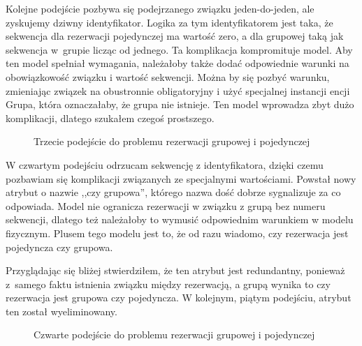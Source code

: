 \documentclass[a4paper,onecolumn,oneside,11pt,wide,floatssmall]{mwrep}
\theoremstyle{definition}
\theoremstyle{plain}%
\theoremstyle{remark}
\begin{document}
Kolejne podejście pozbywa się podejrzanego związku jeden-do-jeden, ale zyskujemy dziwny identyfikator. Logika za tym identyfikatorem jest taka, że sekwencja dla rezerwacji pojedynczej ma wartość zero, a dla grupowej taką jak sekwencja \mbox{w grupie} licząc od jednego. Ta komplikacja kompromituje model. Aby ten model spełniał wymagania, należałoby także dodać odpowiednie warunki na obowiązkowość związku i wartość sekwencji. Można by się pozbyć warunku, zmieniając związek na obustronnie obligatoryjny i użyć specjalnej instancji encji Grupa, która oznaczałaby, że grupa nie istnieje. Ten model wprowadza zbyt dużo komplikacji, dlatego szukałem czegoś prostszego.

\begin{figure}[H]
  \begin{center}
  \end{center}
  \caption{Trzecie podejście do problemu rezerwacji grupowej i pojedynczej}
  \label{fig:db-logical-model-group-reservation-third-try}
\end{figure}

W czwartym podejściu odrzucam sekwencję z identyfikatora, dzięki czemu pozbawiam się komplikacji związanych ze specjalnymi wartościami. Powstał nowy atrybut o nazwie ,,czy grupowa'', którego nazwa dość dobrze sygnalizuje za co odpowiada. Model nie ogranicza rezerwacji w związku z grupą bez numeru sekwencji, dlatego też należałoby to wymusić odpowiednim warunkiem w modelu fizycznym. Plusem tego modelu jest to, że od razu wiadomo, czy rezerwacja jest pojedyncza czy grupowa. 

Przyglądając się bliżej stwierdziłem, że ten atrybut jest redundantny, ponieważ \mbox{z samego} faktu istnienia związku między rezerwacją, a grupą wynika to czy rezerwacja jest grupowa czy pojedyncza. W kolejnym, piątym podejściu, atrybut ten został wyeliminowany.

\begin{figure}[H]
  \begin{center}
  \end{center}
  \caption{Czwarte podejście do problemu rezerwacji grupowej i pojedynczej}
  \label{fig:db-logical-model-group-reservation-fourth-try}
\end{figure}
\end{document}
